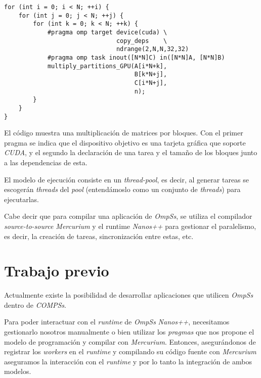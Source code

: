 \begin{minipage}{\linewidth}
\begin{lstlisting}[caption={Multiplicación de un bloque de una matriz utilizando GPUs.}, captionpos=b, label={lst:ompssmatmul.cc}, style=JStyle]
for (int i = 0; i < N; ++i) {
    for (int j = 0; j < N; ++j) {
        for (int k = 0; k < N; ++k) {
            #pragma omp target device(cuda) \
                               copy_deps    \
                               ndrange(2,N,N,32,32)
            #pragma omp task inout([N*N]C) in([N*N]A, [N*N]B)
            multiply_partitions_GPU(A[i*N+k], 
                                    B[k*N+j], 
                                    C[i*N+j], 
                                    n);
        }
    }
}
\end{lstlisting}
\end{minipage}

El código muestra una multiplicación de matrices por bloques. Con el primer pragma se indica que el dispositivo objetivo es una tarjeta gráfica que soporte \textit{CUDA}, y el segundo la declaración de una tarea y el tamaño de los bloques junto a las dependencias de esta.
\par\bigskip

El modelo de ejecución consiste en un \textit{thread-pool}, es decir, al generar tareas se escogerán \textit{threads} del \textit{pool} (entendámoslo como un conjunto de \textit{threads}) para ejecutarlas.
\par\bigskip

Cabe decir que para compilar una aplicación de \textit{OmpSs}, se utiliza el compilador \textit{source-to-source Mercurium} y el runtime \textit{Nanos++} para gestionar el paralelismo, es decir, la creación de tareas, sincronización entre estas, etc.

\section{Trabajo previo} 
\label{sec:compssompss}

Actualmente existe la posibilidad de desarrollar aplicaciones que utilicen \textit{OmpSs} dentro de \textit{COMPSs}. 
\par\bigskip
Para poder interactuar con el \textit{runtime} de \textit{OmpSs} \textit{Nanos++}, necesitamos gestionarlo nosotros manualmente o bien utilizar los \textit{pragmas} que nos propone el modelo de programación y compilar con \textit{Mercurium}. Entonces, asegurándonos de registrar los \textit{workers} en el \textit{runtime} y compilando su código fuente con \textit{Mercurium} aseguramos la interacción con el \textit{runtime} y por lo tanto la integración de ambos modelos.

